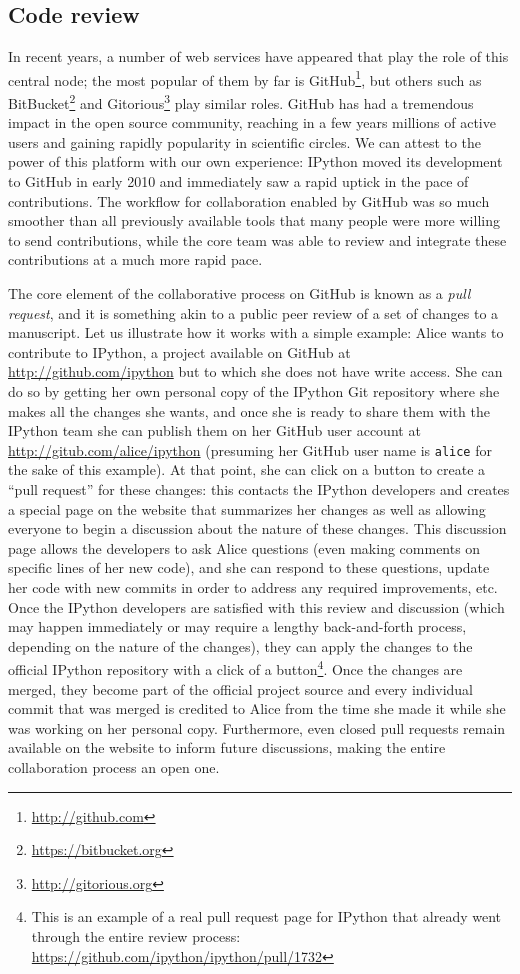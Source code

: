 \documentclass[ChapterTOCs,krantz2]{krantz} %
\begin{document}
\subsection{Code review}

In recent years, a number of web services have appeared that play the role of
this central node; the most popular of them by far is
GitHub\footnote{\url{http://github.com}}, but others such as
BitBucket\footnote{\url{https://bitbucket.org}} and
Gitorious\footnote{\url{http://gitorious.org}} play similar roles.  GitHub has
had a tremendous impact in the open source community, reaching in a few years
millions of active users and gaining rapidly popularity in scientific circles.
We can attest to the power of this platform with our own experience:
IPython moved its development to GitHub in early 2010 and
immediately saw a rapid uptick in the pace of contributions.  The workflow for
collaboration enabled by GitHub was so much smoother than all previously
available tools that many people were more willing to send contributions, while
the core team was able to review and integrate these contributions at a much
more rapid pace.

The core element of the collaborative process on GitHub is known as a
\emph{pull request}, and it is something akin to a public peer review of a set
of changes to a manuscript.  Let us illustrate how it works with a simple
example: Alice wants to contribute to IPython, a project available on GitHub at
\url{http://github.com/ipython} but to which she does not have write access.
She can do so by getting her own personal copy of the IPython Git repository
where she makes all the changes she wants, and once she is ready to share them
with the IPython team she can publish them on her GitHub user account at
\url{http://gitub.com/alice/ipython} (presuming her GitHub user name is
\texttt{alice} for the sake of this example).  At that point, she can click on
a button to create a ``pull request'' for these changes: this contacts the
IPython developers and creates a special page on the website that summarizes
her changes as well as allowing everyone to begin a discussion about the nature
of these changes.  This discussion page allows the developers to ask Alice
questions (even making comments on specific lines of her new code), and she can
respond to these questions, update her code with new commits in order to
address any required improvements, etc.  Once the IPython developers are
satisfied with this review and discussion (which may happen immediately or may
require a lengthy back-and-forth process, depending on the nature of the
changes), they can apply the changes to the official IPython repository with a
click of a button\footnote{This is an example of a real pull request page for
  IPython that already went through the entire review process:
  \url{https://github.com/ipython/ipython/pull/1732}}.  Once the changes are
merged, they become part of the official project source and every individual
commit that was merged is credited to Alice from the time she made it while she
was working on her personal copy.  Furthermore, even closed pull requests
remain available on the website to inform future discussions, making the entire
collaboration process an open one.
\end{document}
